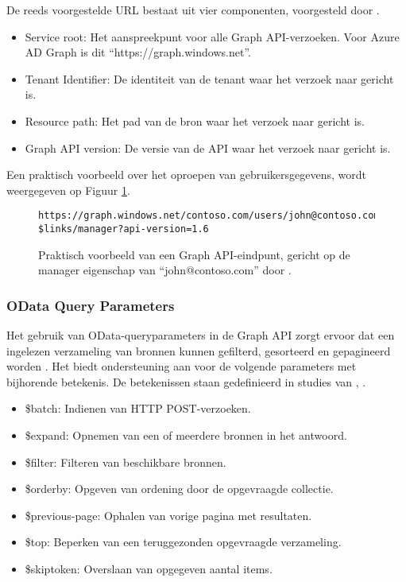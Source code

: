 De reeds voorgestelde \ac{URL} bestaat uit vier componenten, voorgesteld door \textcite{Microsoft2015}.

\begin{itemize}
    \item Service root: Het aanspreekpunt voor alle Graph \ac{API}-verzoeken. Voor Azure \ac{AD} Graph is dit “https://graph.windows.net”.
    \item Tenant Identifier: De identiteit van de tenant waar het verzoek naar gericht is.
    \item Resource path: Het pad van de bron waar het verzoek naar gericht is.
    \item Graph \ac{API} version: De versie van de \ac{API} waar het verzoek naar gericht is.
\end{itemize}

Een praktisch voorbeeld over het oproepen van gebruikersgegevens, wordt weergegeven op Figuur \ref{pfe}. \\

\begin{figure}[h]
    \scriptsize\begin{verbatim}https://graph.windows.net/contoso.com/users/john@contoso.com/
$links/manager?api-version=1.6
    \end{verbatim}    
    \caption[Voorbeeld Graph API-eindpunt]{Praktisch voorbeeld van een Graph \ac{API}-eindpunt, gericht op de manager eigenschap van “john@contoso.com” door \textcite{Microsoft2015}.}
    \label{pfe}
\end{figure}



\subsubsection{OData Query Parameters}


Het gebruik van OData-queryparameters in de Graph \ac{API} zorgt ervoor dat een ingelezen verzameling van bronnen kunnen gefilterd, gesorteerd en gepagineerd worden \autocite{Microsoft2015}. Het biedt ondersteuning aan voor de volgende parameters met bijhorende betekenis. De betekenissen staan gedefinieerd in studies van \textcite{Liang2016}, \textcite{Wojcieszyn2014}. 

\begin{itemize}
    \item \$batch: Indienen van \ac{HTTP} POST-verzoeken.
    \item \$expand: Opnemen van een of meerdere bronnen in het antwoord.
    \item \$filter: Filteren van beschikbare bronnen.
    \item \$orderby: Opgeven van ordening door de opgevraagde collectie.
    \item \$previous-page: Ophalen van vorige pagina met resultaten.
    \item \$top: Beperken van een teruggezonden opgevraagde verzameling.
    \item \$skiptoken: Overslaan van opgegeven aantal items.
\end{itemize}

